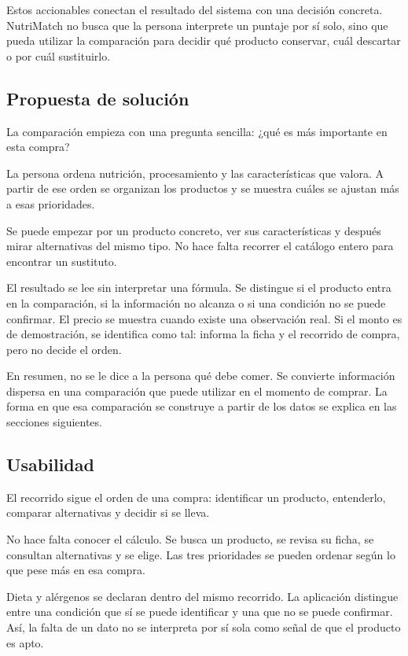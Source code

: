 Estos accionables conectan el resultado del sistema con una decisión concreta. NutriMatch no busca que la persona interprete un puntaje por sí solo, sino que pueda utilizar la comparación para decidir qué producto conservar, cuál descartar o por cuál sustituirlo.

\subsection{Propuesta de solución}

La comparación empieza con una pregunta sencilla: ¿qué es más importante en esta compra?

La persona ordena nutrición, procesamiento y las características que valora. A partir de ese orden se organizan los productos y se muestra cuáles se ajustan más a esas prioridades.

Se puede empezar por un producto concreto, ver sus características y después mirar alternativas del mismo tipo. No hace falta recorrer el catálogo entero para encontrar un sustituto.

El resultado se lee sin interpretar una fórmula. Se distingue si el producto entra en la comparación, si la información no alcanza o si una condición no se puede confirmar. El precio se muestra cuando existe una observación real. Si el monto es de demostración, se identifica como tal: informa la ficha y el recorrido de compra, pero no decide el orden.

En resumen, no se le dice a la persona qué debe comer. Se convierte información dispersa en una comparación que puede utilizar en el momento de comprar. La forma en que esa comparación se construye a partir de los datos se explica en las secciones siguientes.

\subsection{Usabilidad}

El recorrido sigue el orden de una compra: identificar un producto, entenderlo, comparar alternativas y decidir si se lleva.

No hace falta conocer el cálculo. Se busca un producto, se revisa su ficha, se consultan alternativas y se elige. Las tres prioridades se pueden ordenar según lo que pese más en esa compra.

Dieta y alérgenos se declaran dentro del mismo recorrido. La aplicación distingue entre una condición que sí se puede identificar y una que no se puede confirmar. Así, la falta de un dato no se interpreta por sí sola como señal de que el producto es apto.

